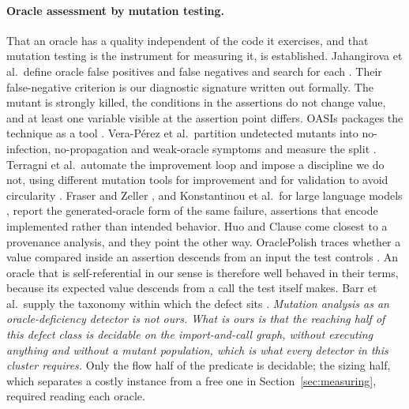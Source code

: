 \documentclass[12pt]{article}
\begin{document}
\paragraph{Oracle assessment by mutation testing.} That an oracle has a quality
independent of the code it exercises, and that mutation testing is the instrument for
measuring it, is established. Jahangirova et al.\ define oracle false
positives and false negatives and search for each
\cite{jahangirova2016,jahangirova2018tse}. Their false-negative criterion is our
diagnostic signature written out formally. The mutant is strongly killed, the
conditions in the assertions do not change value, and at least one variable
visible at the assertion point differs. OASIs packages the technique as a tool
\cite{jahangirova2018oasis}. Vera-P\'erez et al.\ partition undetected
mutants into no-infection, no-propagation and weak-oracle symptoms and measure
the split \cite{veraperez2019}. Terragni et al.\ automate the improvement
loop and impose a discipline we do not, using different mutation tools for
improvement and for validation to avoid circularity \cite{terragni2020}. Fraser
and Zeller \cite{fraser2012}, and Konstantinou et al.\ for large language
models \cite{konstantinou2024}, report the generated-oracle form of the same
failure, assertions that encode implemented rather than intended behavior. Huo
and Clause come closest to a provenance analysis, and they point the other way.
OraclePolish traces whether a value compared inside an assertion descends from an
input the test controls \cite{huo2014}. An oracle that is self-referential in our
sense is therefore well behaved in their terms, because its expected value
descends from a call the test itself makes. Barr et al.\ supply the taxonomy within
which the defect sits \cite{barr2015}. \emph{Mutation analysis as an
oracle-deficiency detector is not ours. What is ours is that the reaching half of
this defect class is decidable on the import-and-call graph, without executing
anything and without a mutant population, which is what every detector in this
cluster requires.} Only the flow half of the predicate is decidable; the sizing half, which
separates a costly instance from a free one in Section~\ref{sec:measuring},
required reading each oracle.
\end{document}

